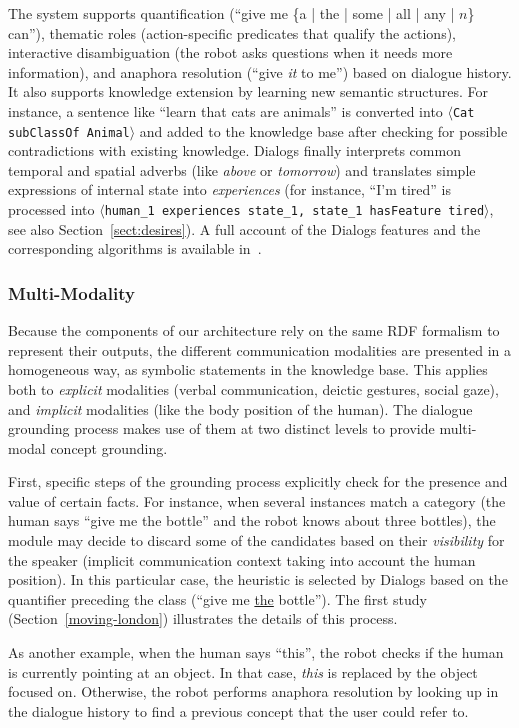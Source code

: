 \documentclass[preprint,3p,times]{elsarticle}
\newcommand{\stmt}[1]{{\footnotesize\tt$\langle$#1\relax$\rangle$}}
\begin{document}
The system supports quantification (``give me \{a | the | some | all | any |
$n$\} can''), thematic roles (action-specific predicates that qualify the
actions), interactive disambiguation (the robot asks questions when it needs
more information), and anaphora resolution (``give \emph{it} to me'') based on
dialogue history. It also supports knowledge extension by learning new semantic
structures. For instance, a sentence like ``learn that cats are animals'' is
converted into \stmt{Cat subClassOf Animal} and added to the knowledge base
after checking for possible contradictions with existing knowledge. {\sc
Dialogs} finally interprets common temporal and spatial adverbs (like
\emph{above} or \emph{tomorrow}) and translates simple expressions of internal
state  into \emph{experiences} (for instance, ``I'm tired'' is processed into
\stmt{human\_1 experiences state\_1, state\_1 hasFeature tired}, see also
Section~\ref{sect:desires}). A full account of the {\sc Dialogs} features and
the corresponding algorithms is available in~\cite{Lemaignan2011a}.

\subsubsection{Multi-Modality}

Because the components of our architecture rely on the same RDF formalism to
represent their outputs, the different communication modalities are presented in
a homogeneous way, as symbolic statements in the knowledge base. This applies
both to \emph{explicit} modalities (verbal communication, deictic gestures,
social gaze), and \emph{implicit} modalities (like the body position of the
human). The dialogue grounding process makes use of them at two distinct levels
to provide multi-modal concept grounding.

First, specific steps of the grounding process explicitly check for the presence
and value of certain facts. For instance, when several instances match a
category (the human says ``give me the bottle'' and the robot knows about three
bottles), the module may decide to discard some of the candidates based on their
\emph{visibility} for the speaker (implicit communication context taking into
account the human position). In this particular case, the heuristic is selected
by {\sc Dialogs} based on the quantifier preceding the class (``give me
\underline{the} bottle''). The first study (Section~\ref{moving-london})
illustrates the details of this process.

As another example, when the human says ``this'', the robot checks if the human
is currently pointing at an object. In that case, \emph{this} is replaced by the
object focused on. Otherwise, the robot performs anaphora resolution by looking
up in the dialogue history to find a previous concept that the user could refer
to.
\end{document}
